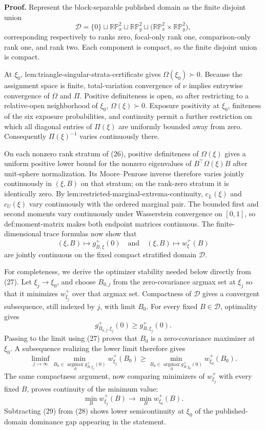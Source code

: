 \textbf{Proof.}
Represent the block-separable published domain as the finite disjoint union
\[
 \mathscr D=\{0\}\sqcup\mathbb {RP}^{2}_{x}\sqcup\mathbb {RP}^{2}_{y}
 \sqcup\bigl(\mathbb {RP}^{2}_{x}\times\mathbb {RP}^{2}_{y}\bigr),
 \tag{26}
\]
corresponding respectively to ranks zero, focal-only rank one, comparison-only rank one, and rank two.  Each component is compact, so the finite disjoint union is compact.

At \(\xi_0\), lem:triangle-singular-strata-certificate gives \(\Omega(\xi_0)\succ0\).  Because the assignment space is finite, total-variation convergence of \(\nu\) implies entrywise convergence of \(\Omega\) and \(\Pi\).  Positive definiteness is open, so after restricting to a relative-open neighborhood of \(\xi_0\), \(\Omega(\xi)\succ0\).  Exposure positivity at \(\xi_0\), finiteness of the six exposure probabilities, and continuity permit a further restriction on which all diagonal entries of \(\Pi(\xi)\) are uniformly bounded away from zero.  Consequently \(\Pi(\xi)^{-1}\) varies continuously there.

On each nonzero rank stratum of (26), positive definiteness of \(\Omega(\xi)\) gives a uniform positive lower bound for the nonzero eigenvalues of \(B^{\top}\Omega(\xi)B\) after unit-sphere normalization.  Its Moore--Penrose inverse therefore varies jointly continuously in \((\xi,B)\) on that stratum; on the rank-zero stratum it is identically zero.  By lem:restricted-marginal-extrema-continuity, \(c_L(\xi)\) and \(c_U(\xi)\) vary continuously with the ordered marginal pair.  The bounded first and second moments vary continuously under Wasserstein convergence on \([0,1]\), so def:moment-matrix makes both endpoint matrices continuous.  The finite-dimensional trace formulas now show that
\[
 (\xi,B)\longmapsto g_{B,\xi}^{+}(0)
 \quad\text{and}\quad
 (\xi,B)\longmapsto w_\xi^{+}(B)
 \tag{27}
\]
are jointly continuous on the fixed compact stratified domain \(\mathscr D\).

For completeness, we derive the optimizer stability needed below directly from (27).  Let \(\xi_j\to\xi_0\), and choose \(B_{0,j}\) from the zero-covariance argmax set at \(\xi_j\) so that it minimizes \(w_{\xi_j}^{+}\) over that argmax set.  Compactness of \(\mathscr D\) gives a convergent subsequence, still indexed by \(j\), with limit \(B_0\).  For every fixed \(B\in\mathscr D\), optimality gives
\[
 g_{B_{0,j},\xi_j}^{+}(0)\ge g_{B,\xi_j}^{+}(0).
\]
Passing to the limit using (27) proves that \(B_0\) is a zero-covariance maximizer at \(\xi_0\).  A subsequence realizing the lower limit therefore gives
\[
 \liminf_{j\to\infty}
 \min_{B_0\in\operatorname*{argmax}_B g_{B,\xi_j}^{+}(0)}w_{\xi_j}^{+}(B_0)
 \ge
 \min_{B_0\in\operatorname*{argmax}_B g_{B,\xi_0}^{+}(0)}w_{\xi_0}^{+}(B_0).
 \tag{28}
\]
The same compactness argument, now comparing minimizers of \(w_{\xi_j}^{+}\) with every fixed \(B\), proves continuity of the minimum value:
\[
 \min_B w_{\xi_j}^{+}(B)\longrightarrow\min_Bw_{\xi_0}^{+}(B).
 \tag{29}
\]
Subtracting (29) from (28) shows lower semicontinuity at \(\xi_0\) of the published-domain dominance gap appearing in the statement.

